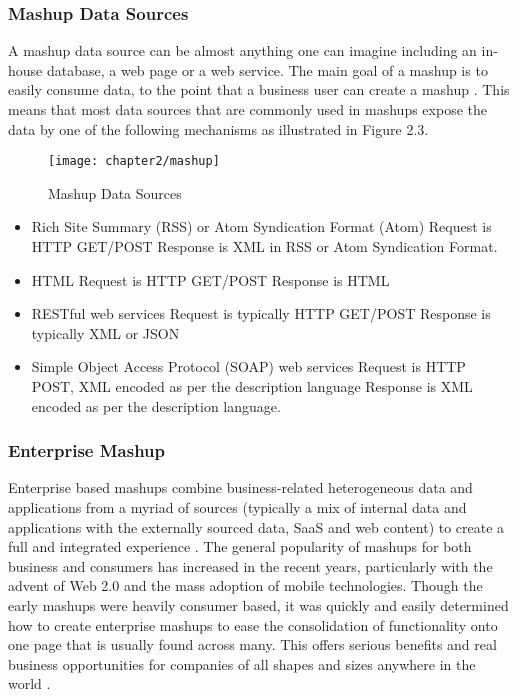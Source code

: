 \subsubsection{Mashup Data Sources}

A mashup data source can be almost anything one can imagine including an in-house database, a web page or a web service. The main goal of a mashup is to easily consume data, to the point that a business user can create a mashup \cite{gomadam2012data}. This means that most data sources that are commonly used in mashups expose the data by one of the following mechanisms as illustrated in Figure 2.3.

\begin{figure}[H]
\centering
\texttt{[image: chapter2/mashup]}
\caption{Mashup Data Sources }
\end{figure}


\begin{itemize}
\item Rich Site Summary (RSS) or Atom Syndication Format (Atom)
\subsubitem Request is HTTP GET/POST
\subsubitem Response is XML in RSS or Atom Syndication Format.
\item HTML
\subitem Request is HTTP GET/POST
\subitem Response is HTML
\item RESTful web services
\subitem Request is typically HTTP GET/POST
\subitem Response is typically XML or JSON
\item Simple Object Access Protocol (SOAP) web services
\subitem Request is HTTP POST, XML encoded as per the description language
\subitem Response is XML encoded as per the description language.
\end{itemize}

\subsubsection{Enterprise Mashup}

Enterprise based mashups combine business-related heterogeneous data and applications from a myriad of sources (typically a mix of internal data and applications with the externally sourced data, SaaS and web content) to create a full and integrated experience \cite{hoyer2008market}. The general popularity of mashups for both business and consumers has increased in the recent years, particularly with the advent of Web 2.0 and the mass adoption of mobile technologies. Though the early mashups were heavily consumer based, it was quickly and easily determined how to create enterprise mashups to ease the consolidation of functionality onto one page that is usually found across many. This  offers serious benefits and real business opportunities for companies of all shapes and sizes anywhere in the world \cite{he2014enhancing}.

